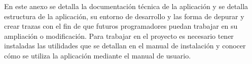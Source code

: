 En este anexo se detalla la documentación técnica de la aplicación y se detalla estructura de la aplicación, su entorno de desarrollo y las forma de depurar y crear trazas con el fin de que futuros programadores puedan trabajar en su ampliación o modificación.
Para trabajar en el proyecto es necesario tener instaladas las utilidades que se detallan en el manual de instalación y conocer cómo se utiliza la aplicación mediante el manual de usuario.